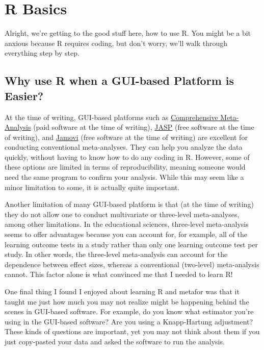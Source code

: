 \documentclass[
]{book}
\begin{document}
\hypertarget{rbasics}{%
\chapter{R Basics}\label{rbasics}}

Alright, we're getting to the good stuff here, how to use R. You might be a bit anxious because R requires coding, but don't worry, we'll walk through everything step by step.

\hypertarget{why-use-r-when-a-gui-based-platform-is-easier}{%
\section{Why use R when a GUI-based Platform is Easier?}\label{why-use-r-when-a-gui-based-platform-is-easier}}

At the time of writing, GUI-based platforms such as \href{https://meta-analysis.com/}{Comprehensive Meta-Analysis} (paid software at the time of writing), \href{https://jasp-stats.org/}{JASP} (free software at the time of writing), and \href{https://www.jamovi.org/}{Jamovi} (free software at the time of writing) are excellent for conducting conventional meta-analyses. They can help you analyze the data quickly, without having to know how to do any coding in R. However, some of these options are limited in terms of reproducibility, meaning someone would need the same program to confirm your analysis. While this may seem like a minor limitation to some, it is actually quite important.

Another limitation of many GUI-based platform is that (at the time of writing) they do not allow one to conduct multivariate or three-level meta-analyses, among other limitations. In the educational sciences, three-level meta-analysis seems to offer advantages because you can account for, for example, all of the learning outcome tests in a study rather than only one learning outcome test per study. In other words, the three-level meta-analysis can account for the dependence between effect sizes, whereas a conventional (two-level) meta-analysis cannot. This factor alone is what convinced me that I needed to learn R!

One final thing I found I enjoyed about learning R and metafor\citep{viechtbauer2010} was that it taught me just how much you may not realize might be happening behind the scenes in GUI-based software. For example, do you know what estimator you're using in the GUI-based software? Are you using a Knapp-Hartung adjustment? These kinds of questions are important, yet you may not think about them if you just copy-pasted your data and asked the software to run the analysis.
\end{document}
